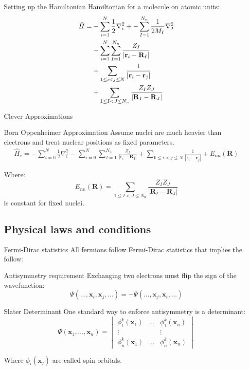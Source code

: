 \documentclass{beamer}
\begin{document}
\begin{frame}{Setting up the Hamiltonian}
Hamiltonian for a molecule on atomic units:
\begin{align}
   \hat H   = & -\sum_{i=1}^{N}\frac{1}{2}\nabla_i^{2} +
-\sum_{I=1}^{N_n}\frac{1}{2M_I}\nabla_I^{2} \notag \\
& -\sum_{i=1}^{N}\sum_{I=1}^{N_n}\frac{Z_I}{|\mathbf r_i-\mathbf R_I|} \notag \\
& + \sum_{1\le i<j\le N}\frac{1}{|\mathbf r_i-\mathbf r_j|} \notag \\
& + \sum_{1\le I<J\le N_n}\frac{Z_I Z_J}{|\mathbf R_I-\mathbf R_J|} \notag
\end{align}
\end{frame}
\begin{frame}{Clever Approximations}
\begin{block}{Born Oppenheimer Approximation}
Assume nuclei are much heavier than electrons and treat nuclear positions as fixed parameters.
\begin{align}
\hat H_e
=-\sum_{i=0}^{N}\frac{1}{2}\nabla_i^{2}
-\sum_{i=0}^{N}\sum_{I=1}^{N_n}\frac{Z_I}{|\mathbf r_i-\mathbf R_I|}
+\sum_{0\le i<j\le N}\frac{1}{|\mathbf r_i-\mathbf r_j|}
+E_{nn}(\mathbf R)
\end{align}
\end{block}
Where:
\[
E_{nn}(\mathbf R)=\sum_{1\le I<J\le N_n}\frac{Z_I Z_J}{|\mathbf R_I-\mathbf R_J|}
\]
is constant for fixed nuclei.
\end{frame}
\subsection{Physical laws and conditions}
\begin{frame}{Fermi-Dirac statistics}
All fermions follow Fermi-Dirac statistics that implies the follow:
\begin{alertblock}{Antisymmetry requirement}
Exchanging two electrons must flip the sign of the wavefunction:
$$
\Psi(\dots,\mathbf{x}_i,\mathbf{x}_j,\dots)
=-\Psi(\dots,\mathbf{x}_j,\mathbf{x}_i,\dots)
$$
\end{alertblock}


\begin{block}{Slater Determinant}
One standard way to enforce antisymmetry is a determinant:
\begin{equation}
\Psi(\mathbf{x}_1,\dots,\mathbf{x}_n)=
\begin{vmatrix}
\phi_{1}^{k}(\mathbf{x}_{1})  & \dots  &  \phi_{1}^{k}(\mathbf{x}_{n}) \\
\vdots   &  & \vdots  \\
\phi_{n}^{k}(\mathbf{x}_{1}) & \dots & \phi_{n}^{k}(\mathbf{x}_{n})
\end{vmatrix}
\end{equation}
\end{block}
Where $\phi_{i}(\mathbf{x}_j)$ are called spin orbitals.
\end{frame}
\end{document}
